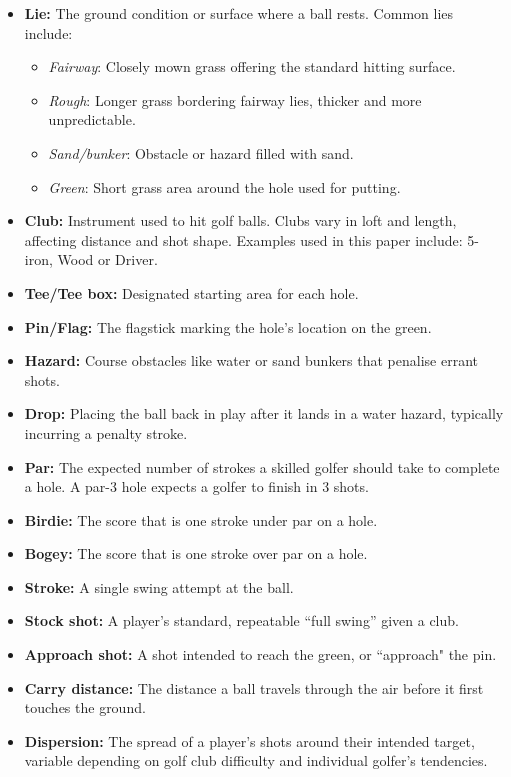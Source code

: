\documentclass[11pt, letterpaper]{article}
\begin{document}
\begin{itemize}
    \item \textbf{Lie:} The ground condition or surface where a ball rests. Common lies include:
    \begin{itemize}
        \item\textit{Fairway}: Closely mown grass offering the standard hitting surface.
        \item\textit{Rough}: Longer grass bordering fairway lies, thicker and more unpredictable.
        \item\textit{Sand/bunker}: Obstacle or hazard filled with sand.
        \item\textit{Green}: Short grass area around the hole used for putting.
    \end{itemize}
    \item\textbf{Club:} Instrument used to hit golf balls. Clubs vary in loft and length, affecting distance and shot shape. Examples used in this paper include: 5-iron, Wood or Driver.
    \item\textbf{Tee/Tee box:} Designated starting area for each hole.
    \item\textbf{Pin/Flag:} The flagstick marking the hole's location on the green.
    \item\textbf{Hazard:} Course obstacles like water or sand bunkers that penalise errant shots.
    \item\textbf{Drop:} Placing the ball back in play after it lands in a water hazard, typically incurring a penalty stroke.
    \item \textbf{Par:} The expected number of strokes a skilled golfer should take to complete a hole. A par-3 hole expects a golfer to finish in 3 shots.
    \item \textbf{Birdie:} The score that is one stroke under par on a hole.
    \item \textbf{Bogey:} The score that is one stroke over par on a hole.
    \item\textbf{Stroke:} A single swing attempt at the ball.
    \item\textbf{Stock shot:} A player's standard, repeatable ``full swing'' given a club.
    \item\textbf{Approach shot:} A shot intended to reach the green, or ``approach" the pin.
    \item \textbf{Carry distance:} The distance a ball travels through the air before it first touches the ground.
    \item \textbf{Dispersion:} The spread of a player’s shots around their intended target, variable depending on golf club difficulty and individual golfer's tendencies.

\end{itemize}
\end{document}
